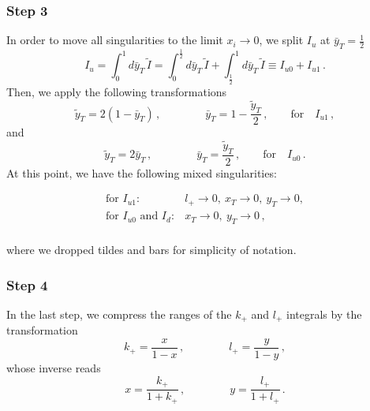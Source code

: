 \documentclass[a4paper,11pt]{report}
\numberwithin{equation}{section}
\newcommand{\kp}{k_+}
\newcommand{\lp}{l_+}
\begin{document}
\subsubsection*{Step 3}

In order to move all singularities to the limit $x_i \to 0$, we split $I_u$ at 
$\bar y_T = \frac12$
%
\begin{equation}
 I_u = \int_0^1 d \bar y_T\, \tilde I =
 \int_0^\frac12 d \bar y_T\, \tilde I +
 \int_\frac12^1 d \bar y_T\, \tilde I \equiv I_{u0} + I_{u1}\,.
\end{equation}
%
Then, we apply the following transformations
%
\begin{equation}
  \tilde y_T = 2(1-\bar y_T)\,,
  \qquad \qquad
  \bar y_T = 1-\frac{\tilde y_T}{2}\,,
  \qquad 
  \text{for}\quad I_{u1}\,,
\end{equation}
%
and
%
\begin{equation}
  \tilde y_T = 2 \bar y_T\,,
  \qquad \qquad
  \bar y_T = \frac{\tilde y_T}{2}\,,
  \qquad 
  \text{for}\quad I_{u0}\,.
\end{equation}
%
At this point, we have the following mixed singularities:

\begin{displaymath}
  \begin{array}{ll}
   \text{for }  I_{u1}: &
   l_+ \to 0,\ x_T \to 0,\ y_T \to 0,
   \\
    \text{for } I_{u0} \text{ and } I_d: &
    x_T \to 0,\  y_T \to 0\,,
    \\[0.5em]
  \end{array}
\end{displaymath}
 
\noindent
where we dropped tildes and bars for simplicity of notation.

\subsubsection*{Step 4}

In the last step, we compress the ranges of the $\kp$ and $\lp$ integrals by the
transformation
%
\begin{equation}
  \kp = \frac{x}{1-x}\,, 
  \qquad \qquad
  \lp = \frac{y}{1-y}\,, 
\end{equation}
%
whose inverse reads
\begin{equation}
  x = \frac{\kp}{1+\kp}\,, 
  \qquad \qquad
  y = \frac{\lp}{1+\lp}\,.
\end{equation}
\end{document}
